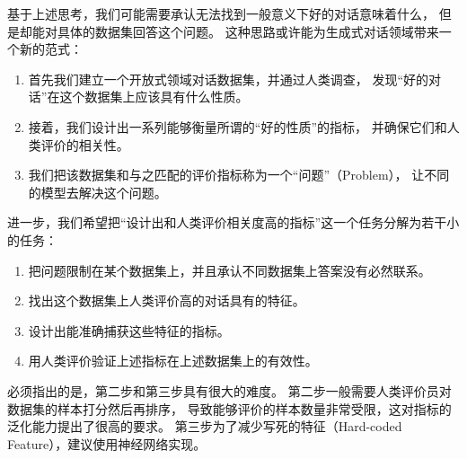 基于上述思考，我们可能需要承认无法找到一般意义下好的对话意味着什么，
但是却能对具体的数据集回答这个问题。
这种思路或许能为生成式对话领域带来一个新的范式：
\begin{enumerate}
    \item 首先我们建立一个开放式领域对话数据集，并通过人类调查，
    发现“好的对话”在这个数据集上应该具有什么性质。
    \item 接着，我们设计出一系列能够衡量所谓的“好的性质”的指标，
    并确保它们和人类评价的相关性。
    \item 我们把该数据集和与之匹配的评价指标称为一个“问题”（Problem），
    让不同的模型去解决这个问题。
\end{enumerate}

进一步，我们希望把“设计出和人类评价相关度高的指标”这一个任务分解为若干小的任务：
\begin{enumerate}
    \item 把问题限制在某个数据集上，并且承认不同数据集上答案没有必然联系。
    \item 找出这个数据集上人类评价高的对话具有的特征。
    \item 设计出能准确捕获这些特征的指标。
    \item 用人类评价验证上述指标在上述数据集上的有效性。
\end{enumerate}

必须指出的是，第二步和第三步具有很大的难度。
第二步一般需要人类评价员对数据集的样本打分然后再排序，
导致能够评价的样本数量非常受限，这对指标的泛化能力提出了很高的要求。
第三步为了减少写死的特征（Hard-coded Feature），建议使用神经网络实现。


